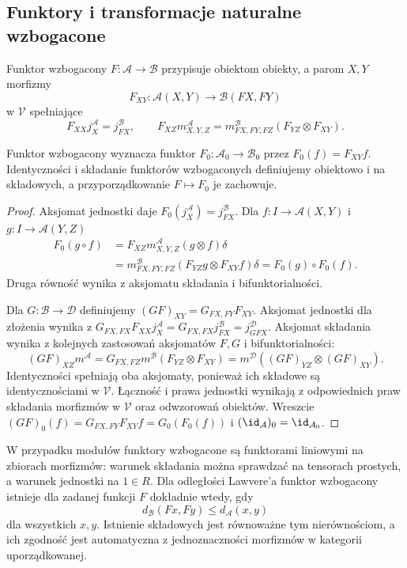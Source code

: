 \subsection{Funktory i transformacje naturalne wzbogacone}

\begin{definicja}\label{cat:def:enriched-functor}
Funktor wzbogacony $F:\mathcal A\to\mathcal B$ przypisuje obiektom obiekty, a parom $X,Y$ morfizmy
\[
 F_{XY}:\mathcal A(X,Y)\to\mathcal B(FX,FY)
\]
w $\mathcal V$ spełniające
\[
 F_{XX}j_X^{\mathcal A}=j_{FX}^{\mathcal B},\qquad
 F_{XZ}m^{\mathcal A}_{X,Y,Z}
 =m^{\mathcal B}_{FX,FY,FZ}(F_{YZ}\otimes F_{XY}).
\]
\end{definicja}

\begin{stwierdzenie}\label{cat:prop:enriched-functor-underlying}
Funktor wzbogacony wyznacza funktor $F_0:\mathcal A_0\to\mathcal B_0$ przez $F_0(f)=F_{XY}f$. Identyczności i składanie funktorów wzbogaconych definiujemy obiektowo i na składowych, a przyporządkowanie $F\mapsto F_0$ je zachowuje.
\end{stwierdzenie}
\begin{proof}
Aksjomat jednostki daje $F_0(j_X^{\mathcal A})=j_{FX}^{\mathcal B}$. Dla $f:I\to\mathcal A(X,Y)$ i $g:I\to\mathcal A(Y,Z)$
\[
 \begin{aligned}
 F_0(g\circ f)&=F_{XZ}m^{\mathcal A}_{X,Y,Z}(g\otimes f)\delta\\
 &=m^{\mathcal B}_{FX,FY,FZ}(F_{YZ}g\otimes F_{XY}f)\delta
 =F_0(g)\circ F_0(f).
 \end{aligned}
\]
Druga równość wynika z aksjomatu składania i bifunktorialności.

Dla $G:\mathcal B\to\mathcal D$ definiujemy $(GF)_{XY}=G_{FX,FY}F_{XY}$. Aksjomat jednostki dla złożenia wynika z $G_{FX,FX}F_{XX}j_X^{\mathcal A}=G_{FX,FX}j_{FX}^{\mathcal B}=j_{GFX}^{\mathcal D}$. Aksjomat składania wynika z kolejnych zastosowań aksjomatów $F,G$ i bifunktorialności:
\[
 (GF)_{XZ}m^{\mathcal A}
 =G_{FX,FZ}m^{\mathcal B}(F_{YZ}\otimes F_{XY})
 =m^{\mathcal D}((GF)_{YZ}\otimes(GF)_{XY}).
\]
Identyczności spełniają oba aksjomaty, ponieważ ich składowe są identycznościami w $\mathcal V$. Łączność i prawa jednostki wynikają z odpowiednich praw składania morfizmów w $\mathcal V$ oraz odwzorowań obiektów. Wreszcie $(GF)_0(f)=G_{FX,FY}F_{XY}f=G_0(F_0(f))$ i $(\id_{\mathcal A})_0=\id_{\mathcal A_0}$.
\end{proof}

\begin{przyklad}\label{cat:ex:enriched-functors}
W przypadku modułów funktory wzbogacone są funktorami liniowymi na zbiorach morfizmów: warunek składania można sprawdzać na tensorach prostych, a warunek jednostki na $1\in R$. Dla odległości Lawvere'a funktor wzbogacony istnieje dla zadanej funkcji $F$ dokładnie wtedy, gdy
\[
 d_{\mathcal B}(Fx,Fy)\leq d_{\mathcal A}(x,y)
\]
dla wszystkich $x,y$. Istnienie składowych jest równoważne tym nierównościom, a ich zgodność jest automatyczna z jednoznaczności morfizmów w kategorii uporządkowanej.
\end{przyklad}

